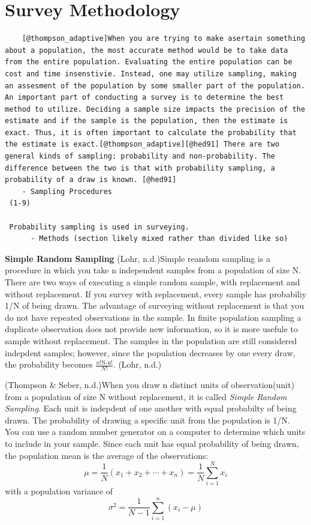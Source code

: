 \documentclass[12pt,twoside]{reedthesis}
\begin{document}
\hypertarget{survey-methodology}{%
\section{Survey Methodology}\label{survey-methodology}}
\begin{verbatim}
    [@thompson_adaptive]When you are trying to make asertain something about a population, the most accurate method would be to take data from the entire population. Evaluating the entire population can be cost and time insenstivie. Instead, one may utilize sampling, making an assesment of the population by some smaller part of the population. An important part of conducting a survey is to determine the best method to utilize. Deciding a sample size impacts the precision of the estimate and if the sample is the population, then the estimate is exact. Thus, it is often important to calculate the probability that the estimate is exact.[@thompson_adaptive][@hed91] There are two general kinds of sampling: probability and non-probability. The difference between the two is that with probability sampling, a probability of a draw is known. [@hed91]
    - Sampling Procedures
 (1-9)
 
 Probability sampling is used in surveying.
      - Methods (section likely mixed rather than divided like so)
\end{verbatim}
\textbf{Simple Random Sampling}
(Lohr, n.d.)Simple reandom sampling is a procedure in which you take n independent samples from a population of size N. There are two ways of executing a simple random sample, with replacement and without replacement. If you survey with replacement, every sample has probabiliy 1/N of being drawn. The advantage of surveying without replacement is that you do not have repeated observations in the sample. In finite population sampling a duplicate observation does not provide new information, so it is more usefule to sample without replacement. The samples in the population are still considered indepdent samples; however, since the population decreases by one every draw, the probability becomes \(\frac{n!\text{N-n}!}{N!}\). (Lohr, n.d.)

(Thompson \& Seber, n.d.)When you draw n distinct units of observation(unit) from a population of size N without replacement, it is called \emph{Simple Random Sampling}. Each unit is indepdent of one another with equal probabilty of being drawn. The probability of drawing a specific unit from the population is 1/N. You can use a random number generator on a computer to determine which units to include in your sample. Since each unit has equal probability of being drawn, the population mean is the average of the observations:
\[
\mu = \frac{1}{N} \left(x_1 + x_2 + \cdots + x_n \right) = \frac{1}{N} \sum^{N}_{i=1} x_i
\]
with a population variance of
\[
\sigma^2 = \frac{1}{N-1} \sum_{i=1}^{n} \left(x_i - \mu \right)
\]
\end{document}
